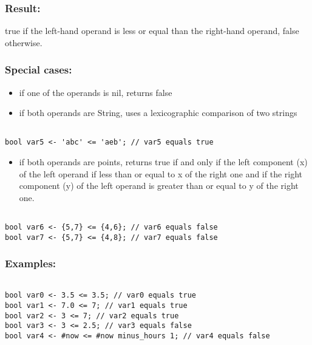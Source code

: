 \documentclass[]{book}
\providecommand{\tightlist}{%
  \setlength{\itemsep}{0pt}\setlength{\parskip}{0pt}}
\theoremstyle{definition}
\theoremstyle{definition}
\theoremstyle{definition}
\theoremstyle{remark}
\begin{document}
\subsubsection{Result:}\label{result-11}

true if the left-hand operand is less or equal than the right-hand
operand, false otherwise.

\subsubsection{Special cases:}\label{special-cases-9}

\begin{itemize}
\tightlist
\item
  if one of the operands is nil, returns false\\
\item
  if both operands are String, uses a lexicographic comparison of two
  strings
\end{itemize}

\begin{verbatim}
 
bool var5 <- 'abc' <= 'aeb'; // var5 equals true
\end{verbatim}

\begin{itemize}
\tightlist
\item
  if both operands are points, returns true if and only if the left
  component (x) of the left operand if less than or equal to x of the
  right one and if the right component (y) of the left operand is
  greater than or equal to y of the right one.
\end{itemize}

\begin{verbatim}
 
bool var6 <- {5,7} <= {4,6}; // var6 equals false 
bool var7 <- {5,7} <= {4,8}; // var7 equals false
\end{verbatim}

\subsubsection{Examples:}\label{examples-8}

\begin{verbatim}
 
bool var0 <- 3.5 <= 3.5; // var0 equals true 
bool var1 <- 7.0 <= 7; // var1 equals true 
bool var2 <- 3 <= 7; // var2 equals true 
bool var3 <- 3 <= 2.5; // var3 equals false 
bool var4 <- #now <= #now minus_hours 1; // var4 equals false
\end{verbatim}
\end{document}
